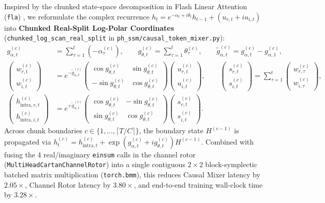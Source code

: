 \documentclass[11pt,a4paper]{article}
\begin{document}
\begin{sloppypar}
Inspired by the chunked state-space decomposition in Flash Linear Attention (\texttt{fla}) \cite{yang2024fla,dao2024transformers}, we reformulate the complex recurrence $h_t = e^{-\alpha_t + i\theta_t} h_{t-1} + (u_{r,t} + i u_{i,t})$ into \textbf{Chunked Real-Split Log-Polar Coordinates} (\texttt{chunked\_log\_scan\_real\_split} in \texttt{ph\_ssm/causal\_token\_mixer.py}):
\begin{align}
    g_{\alpha, t}^{(c)} &= \sum_{\tau=1}^t (-\alpha_\tau^{(c)}), \qquad g_{\theta, t}^{(c)} = \sum_{\tau=1}^t \theta_\tau^{(c)}, \qquad \tilde{g}_{\alpha, t}^{(c)} = g_{\alpha, t}^{(c)} - g_{\alpha, 1}^{(c)}, \\
    \begin{pmatrix} w_{r, t}^{(c)} \\ w_{i, t}^{(c)} \end{pmatrix} &= e^{-\tilde{g}_{\alpha, t}^{(c)}} \begin{pmatrix} \cos g_{\theta, t}^{(c)} & \sin g_{\theta, t}^{(c)} \\ -\sin g_{\theta, t}^{(c)} & \cos g_{\theta, t}^{(c)} \end{pmatrix} \begin{pmatrix} u_{r, t}^{(c)} \\ u_{i, t}^{(c)} \end{pmatrix}, \qquad \begin{pmatrix} s_{r, t}^{(c)} \\ s_{i, t}^{(c)} \end{pmatrix} = \sum_{\tau=1}^t \begin{pmatrix} w_{r, \tau}^{(c)} \\ w_{i, \tau}^{(c)} \end{pmatrix}, \\
    \begin{pmatrix} h_{\text{intra}, r, t}^{(c)} \\ h_{\text{intra}, i, t}^{(c)} \end{pmatrix} &= e^{+\tilde{g}_{\alpha, t}^{(c)}} \begin{pmatrix} \cos g_{\theta, t}^{(c)} & -\sin g_{\theta, t}^{(c)} \\ \sin g_{\theta, t}^{(c)} & \cos g_{\theta, t}^{(c)} \end{pmatrix} \begin{pmatrix} s_{r, t}^{(c)} \\ s_{i, t}^{(c)} \end{pmatrix}.
\end{align}
Across chunk boundaries $c \in \{1,\dots,\lceil T/C\rceil\}$, the boundary state $H^{(c-1)}$ is propagated via $h_t^{(c)} = h_{\text{intra}, t}^{(c)} + \exp(g_{\alpha, t}^{(c)} + i g_{\theta, t}^{(c)}) H^{(c-1)}$. Combined with fusing the 4 real/imaginary \texttt{einsum} calls in the channel rotor (\texttt{MultiHeadCartanChannelRotor}) into a single contiguous $2\times 2$ block-symplectic batched matrix multiplication (\texttt{torch.bmm}), this reduces Causal Mixer latency by $2.05\times$, Channel Rotor latency by $3.80\times$, and end-to-end training wall-clock time by $\mathbf{3.28\times}$.
\end{sloppypar}
\end{document}
